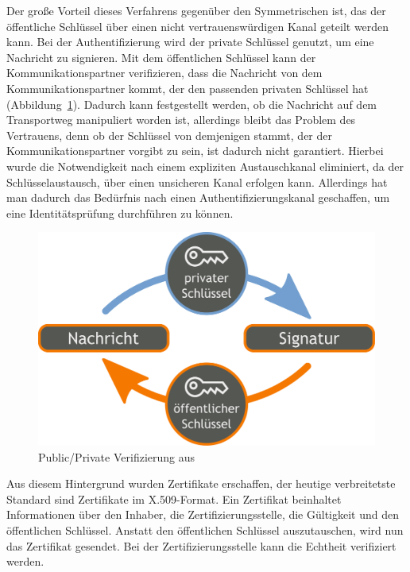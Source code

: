 \documentclass[11pt,a4paper]{report}
\begin{document}
Der große Vorteil dieses Verfahrens gegenüber den Symmetrischen ist, das der öffentliche Schlüssel über einen nicht vertrauenswürdigen Kanal geteilt werden kann. Bei der Authentifizierung wird der private Schlüssel genutzt, um eine Nachricht zu signieren. Mit dem öffentlichen Schlüssel kann der Kommunikationspartner verifizieren, dass die Nachricht von dem Kommunikationspartner kommt, der den passenden privaten Schlüssel hat (Abbildung~\ref{fig:pp_veri}). Dadurch kann festgestellt werden, ob die Nachricht auf dem Transportweg manipuliert worden ist, allerdings bleibt das Problem des Vertrauens, denn ob der Schlüssel von demjenigen stammt, der der Kommunikationspartner vorgibt zu sein, ist dadurch nicht garantiert. Hierbei wurde die Notwendigkeit nach einem expliziten Austauschkanal eliminiert, da der Schlüsselaustausch, über einen unsicheren Kanal erfolgen kann. Allerdings hat man dadurch das Bedürfnis nach einen Authentifizierungskanal geschaffen, um eine Identitätsprüfung durchführen zu können.
 
\begin{figure}[htbp]
\centering
\includegraphics[scale=0.2]{images/public_private_verification.pdf}
\caption{Public/Private Verifizierung aus \cite{wiki_asym_crypto}}
\label{fig:pp_veri}
\end{figure}

Aus diesem Hintergrund wurden Zertifikate erschaffen, der heutige verbreitetste Standard sind Zertifikate im X.509-Format. Ein Zertifikat beinhaltet Informationen über den Inhaber, die Zertifizierungsstelle, die Gültigkeit und den öffentlichen Schlüssel. Anstatt den öffentlichen Schlüssel auszutauschen, wird nun das Zertifikat gesendet. Bei der Zertifizierungsstelle kann die Echtheit verifiziert werden. 
\end{document}
